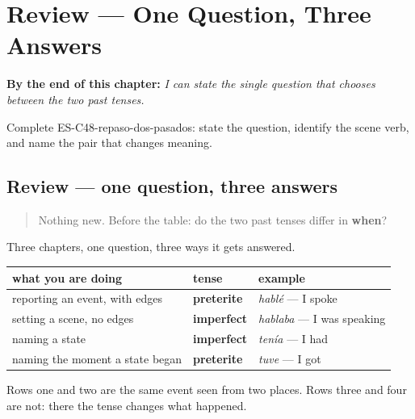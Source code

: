 
\chapter{Review --- One Question, Three Answers}
\label{ch:review-two-pasts}

\begin{chapteropening}
\textbf{By the end of this chapter:} \emph{I can state the single question that chooses between the two past tenses.}

Complete ES-C48-repaso-dos-pasados: state the question, identify the scene verb, and name the pair that changes meaning.
\end{chapteropening}

\section[Practice]{Review — one question, three answers}

\label{lesson:ES-C48-repaso-dos-pasados}



\begin{quote}
Nothing new. Before the table: do the two past tenses differ in \textbf{when}?
\end{quote}

\begin{grammarlens}[title={What you've built}]
Three chapters, one question, three ways it gets answered.

\noindent
\begin{tabularx}{\linewidth}{@{}>{\raggedright\arraybackslash}X>{\raggedright\arraybackslash}X>{\raggedright\arraybackslash}X@{}}
\toprule
\textbf{what you are doing} & \textbf{tense} & \textbf{example} \\
\midrule
reporting an event, with edges & \textbf{preterite} & \emph{hablé} — I spoke \\
setting a scene, no edges & \textbf{imperfect} & \emph{hablaba} — I was speaking \\
naming a state & \textbf{imperfect} & \emph{tenía} — I had \\
naming the moment a state began & \textbf{preterite} & \emph{tuve} — I got \\
\bottomrule
\end{tabularx}

Rows one and two are the same event seen from two places. Rows three and four are not: there the tense changes what happened.
\end{grammarlens}

